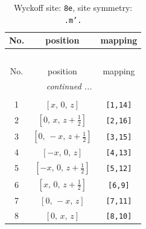 \documentclass[fleqn,8pt]{jsarticle}
\begin{document}
\renewcommand{\arraystretch}{1.2}
\begin{longtable}{ccc}
\caption{Wyckoff site: {\tt 8e}, site symmetry: {\tt .m'.}}
 \\
 \hline \hline
No. & position & mapping \\ \hline \endfirsthead

\multicolumn{2}{l}{\tablename\ \thetable{}} \\
 \hline \hline
No. & position & mapping \\ \hline \endhead

 \hline \hline
\multicolumn{2}{r}{\footnotesize\it continued ...} \\ \endfoot

 \hline \hline
\multicolumn{2}{r}{} \\ \endlastfoot

1 & $\left[ x,\, 0,\, z \right]$ & {\tt [1,14]} \\ \hline
2 & $\left[ 0,\, x,\, z + \frac{1}{2} \right]$ & {\tt [2,16]} \\ \hline
3 & $\left[ 0,\, - x,\, z + \frac{1}{2} \right]$ & {\tt [3,15]} \\ \hline
4 & $\left[ - x,\, 0,\, z \right]$ & {\tt [4,13]} \\ \hline
5 & $\left[ - x,\, 0,\, z + \frac{1}{2} \right]$ & {\tt [5,12]} \\ \hline
6 & $\left[ x,\, 0,\, z + \frac{1}{2} \right]$ & {\tt [6,9]} \\ \hline
7 & $\left[ 0,\, - x,\, z \right]$ & {\tt [7,11]} \\ \hline
8 & $\left[ 0,\, x,\, z \right]$ & {\tt [8,10]} \\
\end{longtable}
\renewcommand{\arraystretch}{1.2}
\end{document}
